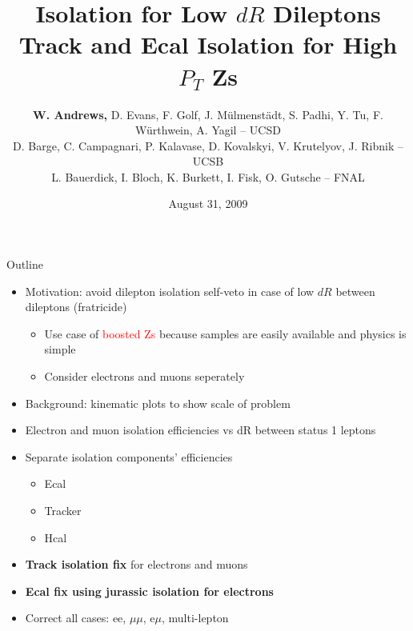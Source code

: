 \documentclass{beamer}
\title[Isolation for Low $dR$ Dileptons]{{\huge Isolation for Low $dR$ Dileptons}\\Track and Ecal Isolation for High $P_T$ Zs}
\author[Warren Andrews]{{\bf W. Andrews,} D. Evans, F. Golf, J. M\"ulmenst\"adt, S. Padhi, Y. Tu, F. W\"urthwein, A. Yagil -- UCSD\\
D. Barge, C. Campagnari, P. Kalavase, D. Kovalskyi, V. Krutelyov, J. Ribnik -- UCSB\\
L. Bauerdick, I. Bloch, K. Burkett, I. Fisk, O. Gutsche -- FNAL}
\institute[UCSD]{}
\date{August 31, 2009}
\begin{document}
\begin{frame}
\titlepage
\end{frame}


\begin{frame}{Outline}
  \begin{itemize}
  \item Motivation: avoid dilepton isolation self-veto in case of low $dR$ between dileptons (fratricide)
    \begin{itemize}
    \item Use case of \textcolor{red}{boosted Zs} because samples are easily available and physics is simple
    \item Consider electrons and muons seperately
    \end{itemize}
  \item Background: kinematic plots to show scale of problem
  \item Electron and muon isolation efficiencies vs dR between status 1 leptons
  \item Separate isolation components' efficiencies
    \begin{itemize}
    \item Ecal
    \item Tracker
    \item Hcal
    \end{itemize}
  \item \textbf{Track isolation fix} for electrons and muons
  \item \textbf{Ecal fix using jurassic isolation for electrons}
  \item Correct all cases: ee, $\mu\mu$, e$\mu$, multi-lepton
  \end{itemize}
\end{frame}
\end{document}
